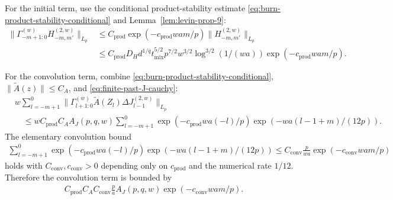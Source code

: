 For the initial term, use the conditional product-stability estimate
\eqref{eq:burn-product-stability-conditional} and Lemma~\ref{lem:levin-prop-9}:
\begin{equation}
\begin{aligned}
\lVert  \Gamma_{-m + 1:0}^{(w)} H_{-m,m'}^{(2,w)}  \rVert_{L_p}
  &\le C_{\text{prod}} \exp(-c_{\text{prod}} w a m / p)
       \lVert  H_{-m,m'}^{(2,w)}  \rVert_{L_p} \\
  &\le C_{\text{prod}} D_H d^{1 / q} t_{\text{mix}}^{5 / 2} p^{7 / 2}
       w^{3 / 2} \log^{3 / 2}(1 / (w a))
       \exp(-c_{\text{prod}} w a m / p).
\end{aligned}
\label{eq:finite-past-H-initial-term}
\end{equation}

For the convolution term, combine \eqref{eq:burn-product-stability-conditional},
\(\lVert \widetilde{A}(z) \rVert \le C_A\), and \eqref{eq:finite-past-J-cauchy}:
\begin{equation}
\begin{aligned}
&w \sum_{l = -m + 1}^0
  \lVert  \Gamma_{l + 1:0}^{(w)} \widetilde{A}(Z_l) \Delta J_{l - 1}^{(2,w)}  \rVert_{L_p} \\
&\quad \le w C_{\text{prod}} C_A A_J(p,q,w)
   \sum_{l = -m + 1}^0
      \exp(-c_{\text{prod}} w a (-l) / p)
      \exp(-w a (l - 1 + m) / (12 p)).
\end{aligned}
\label{eq:finite-past-H-convolution-raw}
\end{equation}
The elementary convolution bound
\begin{equation}
\begin{aligned}
\sum_{l = -m + 1}^0
      \exp(-c_{\text{prod}} w a (-l) / p)
      \exp(-w a (l - 1 + m) / (12 p))
  \le C_{\text{conv}} \frac{p}{w a}
     \exp(-c_{\text{conv}} w a m / p)
\end{aligned}
\label{eq:finite-past-exp-convolution}
\end{equation}
holds with \(C_{\text{conv}}, c_{\text{conv}} > 0\) depending only on \(c_{\text{prod}}\) and
the numerical rate \(1 / 12\). Therefore the convolution term is bounded by
\begin{equation}
\begin{aligned}
C_{\text{prod}} C_A C_{\text{conv}} \frac{p}{a} A_J(p,q,w)
  \exp(-c_{\text{conv}} w a m / p).
\end{aligned}
\label{eq:finite-past-H-convolution-bound}
\end{equation}

